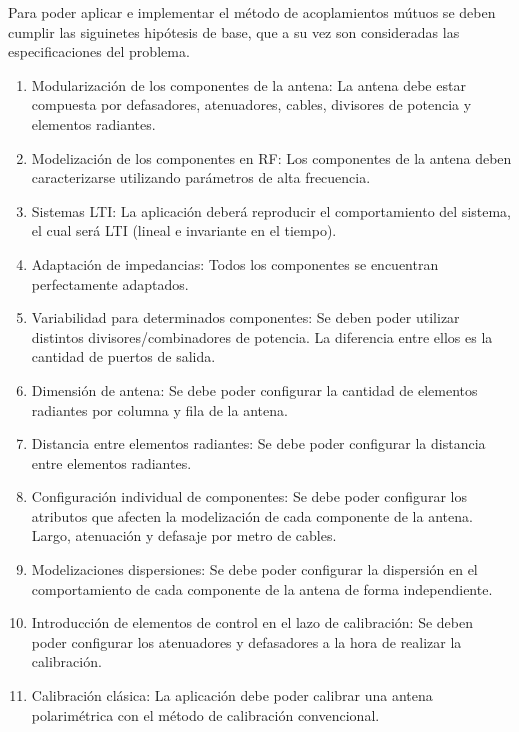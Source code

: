 Para poder aplicar e implementar el método de acoplamientos mútuos se deben cumplir las siguinetes hipótesis de base, que a su
vez son consideradas las especificaciones del problema.

\begin{enumerate}
    \item Modularización de los componentes de la antena: La antena debe estar compuesta por defasadores, atenuadores, cables,
		divisores de potencia y elementos radiantes.

	\item Modelización de los componentes en RF: Los componentes de la antena deben caracterizarse utilizando parámetros de alta
		frecuencia.

    \item Sistemas LTI: La aplicación deberá reproducir el comportamiento del sistema, el cual será LTI (lineal e invariante
		en el tiempo).

	\item Adaptación de impedancias: Todos los componentes se encuentran perfectamente adaptados.

    \item Variabilidad para determinados componentes: Se deben poder utilizar distintos divisores/combinadores de potencia.
		La diferencia entre ellos es la cantidad de puertos de salida.

    \item Dimensión de antena: Se debe poder configurar la cantidad de elementos radiantes por columna y fila de la antena.
    \item Distancia entre elementos radiantes: Se debe poder configurar la distancia entre elementos radiantes.
    \item Configuración individual de componentes: Se debe poder configurar los atributos que afecten la modelización de cada
		componente de la antena. Largo, atenuación y defasaje por metro de cables.

    \item Modelizaciones dispersiones: Se debe poder configurar la dispersión en el comportamiento de cada componente de la
		antena de forma independiente.

    \item Introducción de elementos de control en el lazo de calibración: Se deben poder configurar los atenuadores y
		defasadores a la hora de realizar la calibración.

    \item Calibración clásica: La aplicación debe poder calibrar una antena polarimétrica con el método de calibración convencional.


\end{enumerate}
